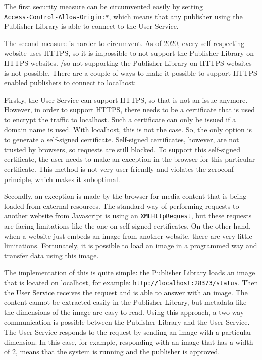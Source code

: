 The first security measure can be circumvented easily by setting \\\texttt{Access-Control-Allow-Origin:*}, which means that any publisher using the Publisher Library is able to connect to the User Service. 

The second measure is harder to circumvent. As of 2020, every self-respecting website uses HTTPS, so it is impossible to not support the Publisher Library on HTTPS websites. /so not supporting the Publisher Library on HTTPS websites is not possible. There are a couple of ways to make it possible to support HTTPS enabled publishers to connect to localhost:

 
Firstly, the User Service can support HTTPS, so that is not an issue anymore. However, in order to support HTTPS, there needs to be a certificate that is used to encrypt the traffic to localhost. Such a certificate can only be issued if a domain name is used. With localhost, this is not the case. So, the only option is to generate a self-signed certificate. Self-signed certificates, however, are not trusted by browsers, so requests are still blocked. To support this self-signed certificate, the user needs to make an exception in the browser for this particular certificate. This method is not very user-friendly and violates the zeroconf principle, which makes it suboptimal.

Secondly, an exception is made by the browser for media content that is being loaded from external resources. The standard way of performing requests to another website from Javascript is using an \texttt{XMLHttpRequest}, but these requests are facing limitations like the one on self-signed certificates. On the other hand, when a website just embeds an image from another website, there are very little limitations. Fortunately, it is possible to load an image in a programmed way and transfer data using this image.

The implementation of this is quite simple: the Publisher Library loads an image that is located on localhost, for example: \texttt{http://localhost:28373/status}. Then the User Service receives the request and is able to answer with an image. The content cannot be extracted easily in the Publisher Library, but metadata like the dimensions of the image are easy to read. Using this approach, a two-way communication is possible between the Publisher Library and the User Service. The User Service responds to the request by sending an image with a particular dimension. In this case, for example, responding with an image that has a width of 2, means that the system is running and the publisher is approved.


